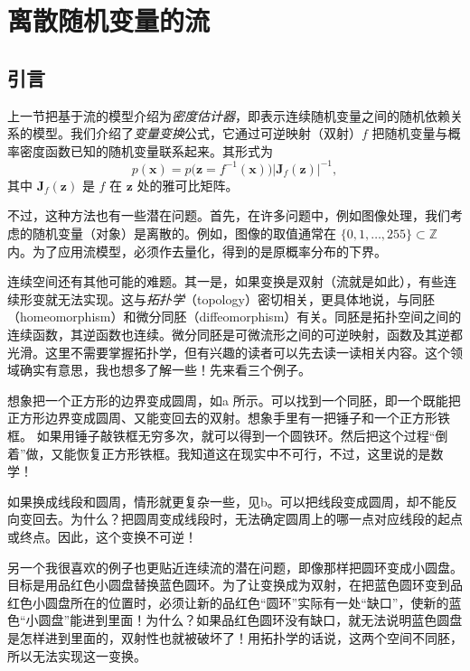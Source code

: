\section{离散随机变量的流}
\subsection{引言}

上一节把基于流的模型介绍为\emph{密度估计器}，即表示连续随机变量之间的随机依赖关系的模型。我们介绍了\emph{变量变换}公式，它通过可逆映射（双射）$f$ 把随机变量与概率密度函数已知的随机变量联系起来。其形式为
\begin{equation}
p(\mathbf{x})=p\bigl(\mathbf{z}=f^{-1}(\mathbf{x})\bigr)
\left|\mathbf{J}_f(\mathbf{z})\right|^{-1},
\tag{4.31}\label{eq:04-31}
\end{equation}
其中 $\mathbf{J}_f(\mathbf{z})$ 是 $f$ 在 $\mathbf{z}$ 处的雅可比矩阵。

不过，这种方法也有一些潜在问题。首先，在许多问题中，例如图像处理，我们考虑的随机变量（对象）是离散的。例如，图像的取值通常在 $\{0,1,\ldots,255\}\subset\mathbb{Z}$ 内。为了应用流模型，必须作去量化，得到的是原概率分布的下界。

连续空间还有其他可能的难题。其一是，如果变换是双射（流就是如此），有些连续形变就无法实现。这与\emph{拓扑学}（topology）密切相关，更具体地说，与同胚（homeomorphism）和微分同胚（diffeomorphism）有关。同胚是拓扑空间之间的连续函数，其逆函数也连续。微分同胚是可微流形之间的可逆映射，函数及其逆都光滑。这里不需要掌握拓扑学，但有兴趣的读者可以先去读一读相关内容。这个领域确实有意思，我也想多了解一些！先来看三个例子。

想象把一个正方形的边界变成圆周，如a 所示。可以找到一个同胚，即一个既能把正方形边界变成圆周、又能变回去的双射。想象手里有一把锤子和一个正方形铁框。
如果用锤子敲铁框无穷多次，就可以得到一个圆铁环。然后把这个过程“倒着”做，又能恢复正方形铁框。我知道这在现实中不可行，不过，这里说的是数学！


如果换成线段和圆周，情形就更复杂一些，见b。可以把线段变成圆周，却不能反向变回去。为什么？把圆周变成线段时，无法确定圆周上的哪一点对应线段的起点或终点。因此，这个变换不可逆！


另一个我很喜欢的例子也更贴近连续流的潜在问题，即像那样把圆环变成小圆盘。目标是用品红色小圆盘替换蓝色圆环。为了让变换成为双射，在把蓝色圆环变到品红色小圆盘所在的位置时，必须让新的品红色“圆环”实际有一处“缺口”，使新的蓝色“小圆盘”能进到里面！为什么？如果品红色圆环没有缺口，就无法说明蓝色圆盘是怎样进到里面的，双射性也就被破坏了！用拓扑学的话说，这两个空间不同胚，所以无法实现这一变换。


